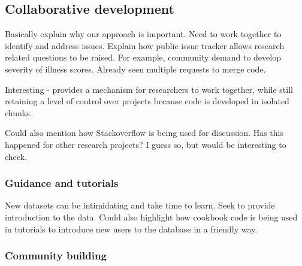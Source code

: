 \documentclass{bioinfo}
\begin{document}
\begin{methods}

\subsection{Collaborative development}



Basically explain why our approach is important. Need to work together to identify  and address issues. Explain how public issue tracker allows research related questions to be raised. For example, community demand to develop severity of illness scores. Already seen multiple requests to merge code.

Interesting - provides a mechanism for researchers to work together, while still retaining a level of control over projects because code is developed in isolated chunks.

Could also mention how Stackoverflow is being used for discussion. Has this happened for other research projects? I guess so, but would be interesting to check.

\subsubsection{Guidance and tutorials}

New datasets can be intimidating and take time to learn. Seek to provide introduction to the data. Could also highlight how cookbook code is being used in tutorials to introduce new users to the database in a friendly way.

\subsubsection{Community building}


\end{methods}
\end{document}
